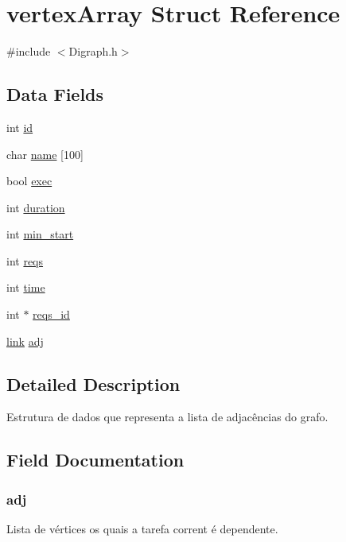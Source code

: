 \hypertarget{structvertex_array}{}\section{vertex\+Array Struct Reference}
\label{structvertex_array}


{\ttfamily \#include $<$Digraph.\+h$>$}

\subsection*{Data Fields}
\begin{DoxyCompactItemize}
\item 
int \hyperlink{structvertex_array_a7441ef0865bcb3db9b8064dd7375c1ea}{id}
\item 
char \hyperlink{structvertex_array_aeaf846aa21a7d016a52f0b5b0c2f5544}{name} \mbox{[}100\mbox{]}
\item 
bool \hyperlink{structvertex_array_a3002b469e7a03a16ba4fd99322d10020}{exec}
\item 
int \hyperlink{structvertex_array_ac6e4b2a3cf932b33832d4e4e4e7cd0de}{duration}
\item 
int \hyperlink{structvertex_array_af597b2d40f09352c45a7949e3efb475a}{min\+\_\+start}
\item 
int \hyperlink{structvertex_array_aafaa8921a9db42eefd598924305f2772}{reqs}
\item 
int \hyperlink{structvertex_array_a42715f65f02da52edc5b22021d8ae670}{time}
\item 
int $\ast$ \hyperlink{structvertex_array_adf15d2ca9e8f0bf7eb53e25582b79cda}{reqs\+\_\+id}
\item 
\hyperlink{_digraph_8h_a80a68ca8aa709322a2736c75938d27ba}{link} \hyperlink{structvertex_array_a818b739a21f6f31f7a9af0a6d9178de7}{adj}
\end{DoxyCompactItemize}


\subsection{Detailed Description}
Estrutura de dados que representa a lista de adjacências do grafo. 

\subsection{Field Documentation}
\subsubsection[{\texorpdfstring{adj}{adj}}]{ adj}\hypertarget{structvertex_array_a818b739a21f6f31f7a9af0a6d9178de7}{}\label{structvertex_array_a818b739a21f6f31f7a9af0a6d9178de7}
Lista de vértices os quais a tarefa corrent é dependente. 
